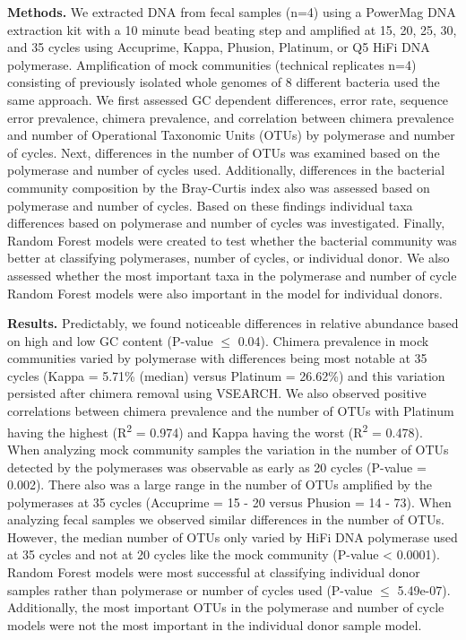 \documentclass[11pt,]{article}
\begin{document}
\textbf{Methods.} We extracted DNA from fecal samples (n=4) using a
PowerMag DNA extraction kit with a 10 minute bead beating step and
amplified at 15, 20, 25, 30, and 35 cycles using Accuprime, Kappa,
Phusion, Platinum, or Q5 HiFi DNA polymerase. Amplification of mock
communities (technical replicates n=4) consisting of previously isolated
whole genomes of 8 different bacteria used the same approach. We first
assessed GC dependent differences, error rate, sequence error
prevalence, chimera prevalence, and correlation between chimera
prevalence and number of Operational Taxonomic Units (OTUs) by
polymerase and number of cycles. Next, differences in the number of OTUs
was examined based on the polymerase and number of cycles used.
Additionally, differences in the bacterial community composition by the
Bray-Curtis index also was assessed based on polymerase and number of
cycles. Based on these findings individual taxa differences based on
polymerase and number of cycles was investigated. Finally, Random Forest
models were created to test whether the bacterial community was better
at classifying polymerases, number of cycles, or individual donor. We
also assessed whether the most important taxa in the polymerase and
number of cycle Random Forest models were also important in the model
for individual donors.

\textbf{Results.} Predictably, we found noticeable differences in
relative abundance based on high and low GC content (P-value
\(\leqslant\) 0.04). Chimera prevalence in mock communities varied by
polymerase with differences being most notable at 35 cycles (Kappa =
5.71\% (median) versus Platinum = 26.62\%) and this variation persisted
after chimera removal using VSEARCH. We also observed positive
correlations between chimera prevalence and the number of OTUs with
Platinum having the highest (R\textsuperscript{2} = 0.974) and Kappa
having the worst (R\textsuperscript{2} = 0.478). When analyzing mock
community samples the variation in the number of OTUs detected by the
polymerases was observable as early as 20 cycles (P-value = 0.002).
There also was a large range in the number of OTUs amplified by the
polymerases at 35 cycles (Accuprime = 15 - 20 versus Phusion = 14 - 73).
When analyzing fecal samples we observed similar differences in the
number of OTUs. However, the median number of OTUs only varied by HiFi
DNA polymerase used at 35 cycles and not at 20 cycles like the mock
community (P-value \textless{} 0.0001). Random Forest models were most
successful at classifying individual donor samples rather than
polymerase or number of cycles used (P-value \(\leqslant\) 5.49e-07).
Additionally, the most important OTUs in the polymerase and number of
cycle models were not the most important in the individual donor sample
model.
\end{document}
